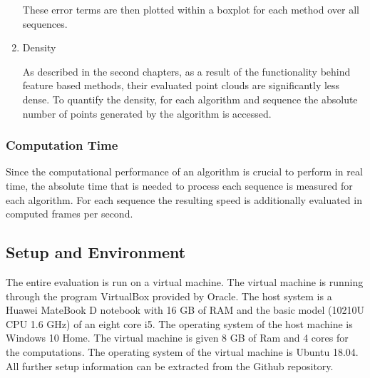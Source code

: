 \begin{enumerate}
	These error terms are then plotted within a boxplot for each method over all sequences. 
	
	\item{Density}
	
	As described in the second chapters, as a result of the functionality behind feature based methods, their evaluated point clouds are 
	significantly less dense. To quantify the density, for each algorithm and sequence the absolute number of points generated by the 
	algorithm is accessed. 
	
	\end{enumerate}
	
\subsubsection{Computation Time}
	
	Since the computational performance of an algorithm is crucial to perform in real time, the absolute time that is needed to process each 
	sequence is measured for each algorithm. For each sequence the resulting speed is additionally evaluated in computed frames per second. 
	
\subsection{Setup and Environment}

	
	The entire evaluation is run on a virtual machine. The virtual machine is running through the program VirtualBox provided by Oracle.
	The host system is a Huawei MateBook D notebook with 16 GB of RAM and the basic model (10210U CPU 1.6 GHz) of an eight core i5. The operating system of the host machine is Windows 10 Home. The virtual
	machine is given 8 GB of Ram and 4 cores for the computations. The operating system of the virtual machine is Ubuntu 18.04. All further setup information can be extracted 
	from the Github repository.
